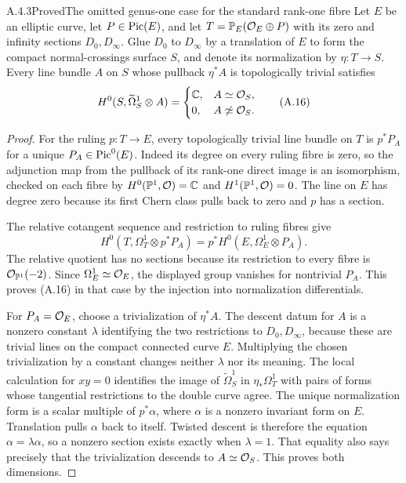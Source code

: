 \begin{statement}{A.4.3}{Proved}{The omitted genus-one case for the standard rank-one fibre}
Let $E$ be an elliptic curve, let $P\in\operatorname{Pic}(E)$, and let $T=\mathbb P_E(\mathcal O_E\oplus P)$ with its zero and infinity sections $D_0,D_\infty$. Glue $D_0$ to $D_\infty$ by a translation of $E$ to form the compact normal-crossings surface $S$, and denote its normalization by $\eta:T\to S$. Every line bundle $A$ on $S$ whose pullback $\eta^*A$ is topologically trivial satisfies
\[
H^0(S,\widetilde\Omega_S^1\otimes A)=
\begin{cases}\mathbb C,&A\simeq\mathcal O_S,\\0,&A\not\simeq\mathcal O_S.\end{cases}
\tag{A.16}
\]
\end{statement}
\begin{proof}
For the ruling $p:T\to E$, every topologically trivial line bundle on $T$ is $p^*P_A$ for a unique $P_A\in\operatorname{Pic}^0(E)$. Indeed its degree on every ruling fibre is zero, so the adjunction map from the pullback of its rank-one direct image is an isomorphism, checked on each fibre by $H^0(\mathbb P^1,\mathcal O)=\mathbb C$ and $H^1(\mathbb P^1,\mathcal O)=0$. The line on $E$ has degree zero because its first Chern class pulls back to zero and $p$ has a section.

The relative cotangent sequence and restriction to ruling fibres give
\[
 H^0(T,\Omega_T^1\otimes p^*P_A)
 =p^*H^0(E,\Omega_E^1\otimes P_A).
\]
The relative quotient has no sections because its restriction to every fibre is $\mathcal O_{\mathbb P^1}(-2)$. Since $\Omega_E^1\simeq\mathcal O_E$, the displayed group vanishes for nontrivial $P_A$. This proves (A.16) in that case by the injection into normalization differentials.

For $P_A=\mathcal O_E$, choose a trivialization of $\eta^*A$. The descent datum for $A$ is a nonzero constant $\lambda$ identifying the two restrictions to $D_0,D_\infty$, because these are trivial lines on the compact connected curve $E$. Multiplying the chosen trivialization by a constant changes neither $\lambda$ nor its meaning. The local calculation for $xy=0$ identifies the image of $\widetilde\Omega_S^1$ in $\eta_*\Omega_T^1$ with pairs of forms whose tangential restrictions to the double curve agree. The unique normalization form is a scalar multiple of $p^*\alpha$, where $\alpha$ is a nonzero invariant form on $E$. Translation pulls $\alpha$ back to itself. Twisted descent is therefore the equation $\alpha=\lambda\alpha$, so a nonzero section exists exactly when $\lambda=1$. That equality also says precisely that the trivialization descends to $A\simeq\mathcal O_S$. This proves both dimensions.
\end{proof}


